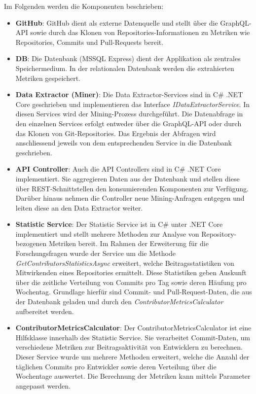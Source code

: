 Im Folgenden werden die Komponenten beschrieben:
\begin{itemize}
    \item \textbf{GitHub}: GitHub dient als externe Datenquelle und stellt über die GraphQL-API sowie durch das Klonen von Repositories-Informationen zu Metriken wie Repositories, Commits und Pull-Requests bereit.
    \item \textbf{DB}: Die Datenbank (MSSQL Express) dient der Applikation als zentrales Speichermedium. In der relationalen Datenbank werden die extrahierten Metriken gespeichert. 
    \item \textbf{Data Extractor (Miner)}: Die Data Extractor-Services sind in C\# .NET Core geschrieben und implementieren das Interface \textit{IDataExtractorService}. In diesen Services wird der Mining-Prozess durchgeführt. Die Datenabfrage in den einzelnen Services erfolgt entweder über die GraphQL-API oder durch das Klonen von Git-Repositories. Das Ergebnis der Abfragen wird anschliessend jeweils von dem entsprechenden Service in die Datenbank geschrieben. 
    \item \textbf{API Controller}: Auch die API Controllers sind in C\# .NET Core implementiert. Sie aggregieren Daten aus der Datenbank und stellen diese über REST-Schnittstellen den konsumierenden Komponenten zur Verfügung. Darüber hinaus nehmen die Controller neue Mining-Anfragen entgegen und leiten diese an den Data Extractor weiter.
    \item \textbf{Statistic Service}: Der Statistic Service ist in C\# unter .NET Core implementiert und stellt mehrere Methoden zur Analyse von Repository-bezogenen Metriken bereit. Im Rahmen der Erweiterung für die Forschungsfragen wurde der Service um die Methode \textit{GetContributorsStatisticsAsync} erweitert, welche Beitragsstatistiken von Mitwirkenden eines Repositories ermittelt. Diese Statistiken geben Auskunft über die zeitliche Verteilung von Commits pro Tag sowie deren Häufung pro Wochentag. Grundlage hierfür sind Commit- und Pull-Request-Daten, die aus der Datenbank geladen und durch den \textit{ContributorMetricsCalculator} aufbereitet werden.
    \item \textbf{ContributorMetricsCalculator}: Der ContributorMetricsCalculator ist eine Hilfsklasse innerhalb des Statistic Service. Sie verarbeitet Commit-Daten, um verschiedene Metriken zur Beitragsaktivität von Entwicklern zu berechnen. Dieser Service wurde um mehrere Methoden erweitert, welche die Anzahl der täglichen Commits pro Entwickler sowie deren Verteilung über die Wochentage auswertet. Die Berechnung der Metriken kann mittels Parameter angepasst werden. 

\end{itemize}
